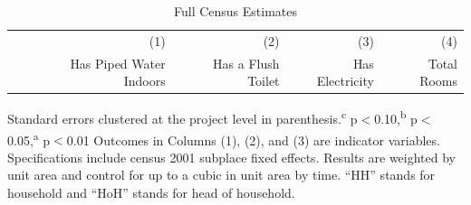 \documentclass[12pt]{article}
\begin{document}
\begin{table}[ht!]
\small
\centering
\caption{Full Census Estimates}\label{table:censusestimatesfull}
\vspace{-2mm}
\begin{threeparttable}
\begin{tabular}{lDDDD}
\toprule
 & \small (1) & \small (2)  & \small (3) & \small (4) \\
& \small Has Piped Water Indoors  & \small Has a Flush Toilet  & \small Has Electricity & \small Total Rooms  \\ \midrule
 
% 
\bottomrule
\end{tabular}
\begin{tablenotes}
\item Standard errors clustered at the project level in parenthesis.\textsuperscript{c} p$<$0.10,\textsuperscript{b} p$<$0.05,\textsuperscript{a} p$<$0.01
Outcomes in Columns (1), (2), and (3) are indicator variables.
Specifications include census 2001 subplace fixed effects.
Results are weighted by unit area and control for up to a cubic in unit area by time. 
``HH'' stands for household and ``HoH'' stands for head of household.
\end{tablenotes}
\end{threeparttable}
\end{table}



\begin{table}[ht!]
\small
\centering
\caption{Census Demographic  Estimates}\label{table:censusestimatesfull2}
\vspace{-2mm}
\end{table}
\end{document}
